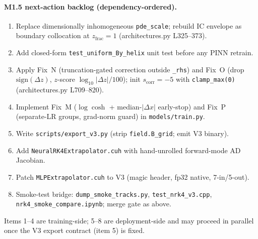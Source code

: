 \documentclass[a4paper,11pt]{article}
\newcommand{\dz}{\Delta z}
\begin{document}
\paragraph{M1.5 next-action backlog (dependency-ordered).}
\begin{enumerate}\setlength{\itemsep}{0pt}
  \item Replace dimensionally inhomogeneous \texttt{pde\_scale};
        rebuild IC envelope as boundary collocation at
        $z_\mathrm{frac}=1$ (architectures.py L325--373).
  \item Add closed-form \texttt{test\_uniform\_By\_helix} unit
        test before any PINN retrain.
  \item Apply Fix~N (truncation-gated correction outside
        \texttt{\_rhs}) and Fix~O (drop $\mathrm{sign}(\dz)$,
        $z$-score $\log_{10}|\dz|/100$); init
        $s_\mathrm{corr}=-5$ with \texttt{clamp\_max(0)}
        (architectures.py L709--820).
  \item Implement Fix~M ($\log\cosh$ + median-$|\Delta x|$
        early-stop) and Fix~P (separate-LR groups, grad-norm
        guard) in \texttt{models/train.py}.
  \item Write \texttt{scripts/export\_v3.py} (strip
        \texttt{field.B\_grid}; emit V3 binary).
  \item Add \texttt{NeuralRK4Extrapolator.cuh} with
        hand-unrolled forward-mode AD Jacobian.
  \item Patch \texttt{MLPExtrapolator.cuh} to V3
        (magic header, fp32 native, 7-in/5-out).
  \item Smoke-test bridge:
        \texttt{dump\_smoke\_tracks.py},
        \texttt{test\_nrk4\_v3.cpp},
        \texttt{nrk4\_smoke\_compare.ipynb}; merge gate as above.
\end{enumerate}
Items 1--4 are training-side; 5--8 are deployment-side and may
proceed in parallel once the V3 export contract (item 5) is
fixed.
\end{document}
